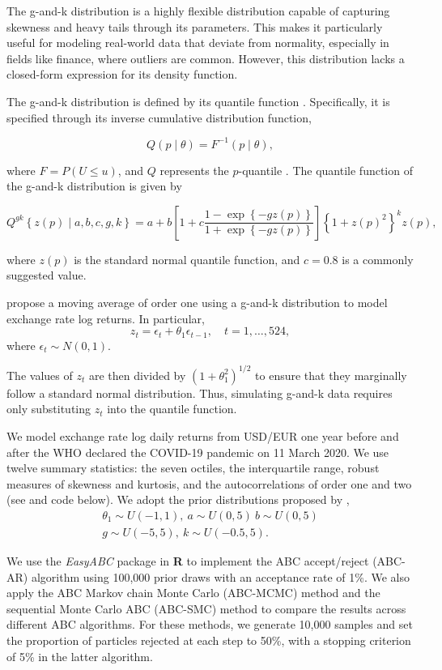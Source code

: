 The g-and-k distribution is a highly flexible distribution capable of capturing skewness and heavy tails through its parameters. This makes it particularly useful for modeling real-world data that deviate from normality, especially in fields like finance, where outliers are common. However, this distribution lacks a closed-form expression for its density function.

The g-and-k distribution is defined by its quantile function \cite{drovandi2011likelihood}. Specifically, it is specified through its inverse cumulative distribution function,

\[
Q(p\mid{\theta}) = F^{-1}(p\mid{\theta}),
\]

where \( F = P(U \leq u) \), and \( Q \) represents the \( p \)-quantile \cite{rayner2002numerical}. The quantile function of the g-and-k distribution is given by

\[
Q^{gk}\left\{z(p)\mid a, b, c, g, k\right\} = a + b\left[1 + c \frac{1 - \exp\left\{-gz(p)\right\}}{1 + \exp\left\{-gz(p)\right\}}\right] \left\{1 + z(p)^2\right\}^k z(p),
\]

where \( z(p) \) is the standard normal quantile function, and \( c = 0.8 \) is a commonly suggested value.

\cite{drovandi2011likelihood} propose a moving average of order one using a g-and-k distribution to model exchange rate log returns. In particular,  
\[
z_t = \epsilon_t + \theta_1\epsilon_{t-1}, \quad t=1,\dots,524,
\]  
where \(\epsilon_t \sim N(0,1)\).  

The values of \(z_t\) are then divided by \((1+\theta_1^2)^{1/2}\) to ensure that they marginally follow a standard normal distribution. Thus, simulating g-and-k data requires only substituting \(z_t\) into the quantile function.  

We model exchange rate log daily returns from USD/EUR one year before and after the WHO declared the COVID-19 pandemic on 11 March 2020. We use twelve summary statistics: the seven octiles, the interquartile range, robust measures of skewness and kurtosis, and the autocorrelations of order one and two (see \cite{drovandi2011likelihood} and code below). We adopt the prior distributions proposed by \cite{ramirez2024testing}, 
\begin{align*}
	\theta_1\sim U(-1,1), \ a\sim U(0,5) \ b\sim U(0,5)\\
	g\sim U(-5,5), \ k\sim U(-0.5, 5).
\end{align*}

We use the \textit{EasyABC} package in \textbf{R} to implement the ABC accept/reject (ABC-AR) algorithm using 100,000 prior draws with an acceptance rate of 1\%. We also apply the ABC Markov chain Monte Carlo (ABC-MCMC) method \cite{marjoram2003markov} and the sequential Monte Carlo ABC (ABC-SMC) method \cite{lenormand2013adaptive} to compare the results across different ABC algorithms. For these methods, we generate 10,000 samples and set the proportion of particles rejected at each step to 50\%, with a stopping criterion of 5\% in the latter algorithm.

